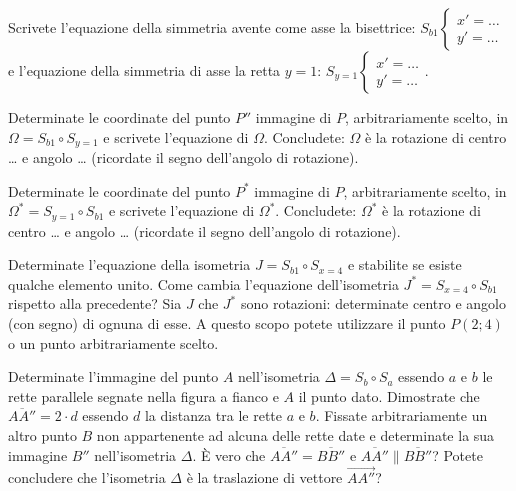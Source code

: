 \begin{esercizio}
\label{ese:8.70} %
Scrivete l'equazione della simmetria avente come asse la bisettrice: 
$S_{b1}\begin{cases}x'=\ldots{}\\y'=\ldots{}\end{cases}$ e 
l'equazione della simmetria di asse la retta $y=1$: 
$S_{y=1}\begin{cases}x'=\ldots{}\\y'=\ldots{}\end{cases}$.
\end{esercizio}

\begin{esercizio}
\label{ese:8.71} %
Determinate le coordinate del punto $P''$ immagine di $P$, 
arbitrariamente scelto, in $\Omega = S_{b1} \circ S_{y=1}$ e scrivete 
l'equazione di $\Omega$.
Concludete: $\Omega$ è la rotazione di centro \ldots{} e angolo 
\ldots{} (ricordate il segno dell'angolo di rotazione).
\end{esercizio}

\begin{esercizio}
\label{ese:8.72} %
Determinate le coordinate del punto $P^*$ immagine di $P$, 
arbitrariamente scelto, in $\Omega^*=S_{y=1} \circ S_{b1}$ e scrivete 
l'equazione di $\Omega^*$.
Concludete: $\Omega^*$ è la rotazione di centro \ldots{} e angolo 
\ldots{} (ricordate il segno dell'angolo di rotazione).
\end{esercizio}

\begin{esercizio}
\label{ese:8.73} %
Determinate l'equazione della isometria $J=S_{b1} \circ S_{x=4}$ e 
stabilite se esiste qualche elemento unito. Come cambia l'equazione 
dell'isometria $J^*=S_{x=4} \circ S_{b1}$ rispetto alla precedente? 
Sia $J$ che $J^*$ sono rotazioni: determinate centro e angolo (con 
segno) di ognuna di esse. A questo scopo potete utilizzare il punto 
$P(2;4)$ o un punto arbitrariamente scelto.
\end{esercizio}

\noindent\begin{minipage}{0.7\textwidth}\parindent15pt
\begin{esercizio}
\label{ese:8.74} %
Determinate l'immagine del punto $A$ nell'isometria $\Delta=S_b \circ 
S_a$ essendo $a$ e $b$ le rette parallele segnate nella figura a 
fianco e $A$ il punto dato. Dimostrate che $\overline{AA''}=2\cdot d$ 
essendo $d$ la distanza tra le rette $a$ e $b$.
Fissate arbitrariamente un altro punto $B$ non appartenente ad alcuna 
delle rette date e determinate la sua immagine $B''$ nell'isometria 
$\Delta$.
\`E vero che $\overline{AA''}=\overline{BB''}$ e $\overline{AA''} 
\parallel \overline{BB''}$? Potete concludere che l'isometria 
$\Delta$ è la traslazione di vettore $\overrightarrow{AA''}$?
\end{esercizio}
\end{minipage}\hfil
\begin{minipage}{0.3\textwidth}
	\centering~~
\end{minipage}\vspace{8pt}

